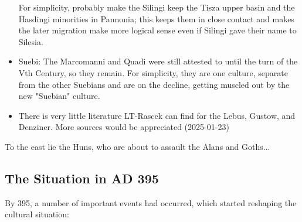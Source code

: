 \documentclass{article}
\begin{document}
\begin{itemize}
		For simplicity, probably make the Silingi keep the Tisza upper basin and the Hasdingi minorities in Pannonia; this keeps them in close contact and makes the later  migration make more logical sense even if Silingi gave their name to Silesia.
		\item Suebi:
		The Marcomanni and Quadi were still attested to until the turn of the Vth Century, so they remain. 
		For simplicity, they are one culture, separate from the other Suebians and are on the decline, getting muscled out by the new "Suebian" culture.
		\item There is very little literature LT-Rascek can find for the Lebus, Gustow, and Denziner.
		More sources would be appreciated (2025-01-23)
	\end{itemize}
	
	To the east lie the Huns, who are about to assault the Alans and Goths...
	
	\subsection{The Situation in AD 395}
	\label{sec:timeline:subsec:395}
	By 395, a number of important events had occurred, which started reshaping the cultural situation:
	
\end{document}
